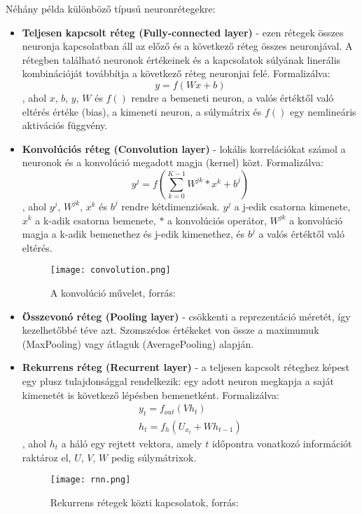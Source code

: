 Néhány példa különböző típusú neuronrétegekre:
\begin{itemize}
 \item \textbf{Teljesen kapcsolt réteg (Fully-connected layer)} - ezen rétegek összes neuronja kapcsolatban áll az előző és a következő réteg összes neuronjával. A rétegben található neuronok értékeinek és a kapcsolatok súlyának linerális kombinációját továbbítja a következő réteg neuronjai felé. Formalizálva:
 \begin{equation}
	y = f(Wx + b)
\end{equation}
, ahol \(x\), \(b\), \(y\), \(W\) és \(f()\) rendre a bemeneti neuron, a valós értéktől való eltérés értéke (bias), a kimeneti neuron, a súlymátrix és \(f()\) egy nemlineáris aktivációs függvény.
 \item \textbf{Konvolúciós réteg (Convolution layer)} - lokális korrelációkat számol a neuronok és a konvolúció megadott magja (kernel) közt. Formalizálva:
 \begin{equation}
	y^j = f(\sum_{k=0}^{K-1}W^{jk}*x^k+b^j)
\end{equation}
, ahol \(y^j\),  \(W^{jk}\), \(x^k\) és \(b^j\) rendre kétdimenziósak. \(y^j\) a j-edik csatorna kimenete, \(x^k\) a k-adik csatorna bemenete, \(*\) a konvolúciós operátor,  \(W^{jk}\) a konvolúció magja a k-adik bemenethez és j-edik kimenethez, és \(b^j\) a valós értéktől való eltérés.
\begin{figure}[H]
  \centering
  \texttt{[image: convolution.png]}
  \caption{A konvolúció művelet, forrás: \cite{deeplearningbook}}
\end{figure}
 \item \textbf{Összevonó réteg (Pooling layer)} - csökkenti a reprezentáció méretét, így kezelhetőbbé téve azt. Szomszédos értékeket von össze a maximumuk (MaxPooling) vagy átlaguk (AveragePooling) alapján.
 \item \textbf{Rekurrens réteg (Recurrent layer)} - a teljesen kapcsolt réteghez képest egy plusz tulajdonsággal rendelkezik: egy adott neuron megkapja a saját kimenetét is következő lépésben bemenetként. Formalizálva:
  \begin{equation}
\begin{split}
	y_t = f_{out}(Vh_t) \\
	h_t = f_h(U_{x_t}+Wh_{t-1})
\end{split}
\end{equation}
, ahol \(h_t\) a háló egy rejtett vektora, amely \(t\) időpontra vonatkozó információt raktároz el, \(U\), \(V\), \(W\) pedig súlymátrixok. \cite{Choi2017}
\begin{figure}[H]
  \centering
  \texttt{[image: rnn.png]}
  \caption{Rekurrens rétegek közti kapcsolatok, forrás: \cite{deeplearningbook}}
\end{figure}
\end{itemize}

